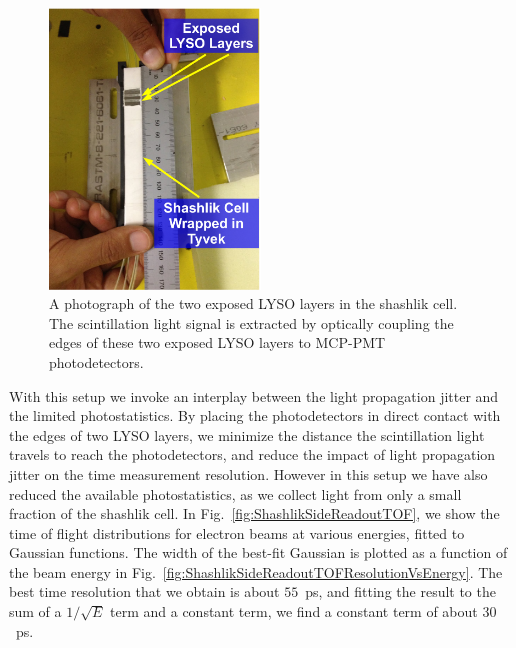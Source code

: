 \begin{figure}[H] \centering
\includegraphics[width=0.5\textwidth]{figs/timing/ShashlikSideReadoutPhotoA} 
\caption{A photograph of the two exposed LYSO layers in the shashlik cell.
The scintillation light signal is extracted by optically coupling
the edges of these two exposed LYSO layers to MCP-PMT
photodetectors. } 
\label{fig:ShashlikSideReadoutExposedLayersPhoto}
\end{figure}


With this setup we invoke an interplay between the light propagation jitter 
and the limited photostatistics. By placing the photodetectors in direct contact with the edges 
of two LYSO layers, we minimize the distance the scintillation light  travels to reach the 
photodetectors, and reduce the impact of light propagation jitter on the time measurement 
resolution. However in this setup we have also reduced the available photostatistics, as we collect 
light from only a small fraction of the shashlik cell. In Fig.~\ref{fig:ShashlikSideReadoutTOF},
we show the time of flight distributions for electron beams at various energies,
fitted to Gaussian functions. The width of the best-fit Gaussian is plotted as a
function of the beam energy in Fig.~\ref{fig:ShashlikSideReadoutTOFResolutionVsEnergy}. The 
best time resolution that we obtain is about $55$~ps, and fitting the result to the sum of
a $1/\sqrt{E}$ term and a constant term, we find a constant term of about
$30$~ps. 

